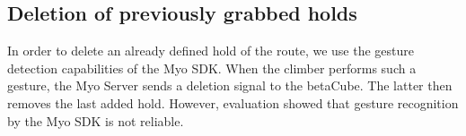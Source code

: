 \subsection{Deletion of previously grabbed holds}

In order to delete an already defined hold of the route, we use the gesture detection capabilities of the Myo SDK.
When the climber performs such a gesture, the Myo Server sends a deletion signal to the betaCube.
The latter then removes the last added hold.
However, evaluation showed that gesture recognition by the Myo SDK is not reliable.
